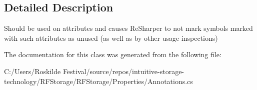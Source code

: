 \subsection{Detailed Description}
Should be used on attributes and causes Re\+Sharper to not mark symbols marked with such attributes as unused (as well as by other usage inspections) 



The documentation for this class was generated from the following file\+:\begin{DoxyCompactItemize}
\item 
C\+:/\+Users/\+Roskilde Festival/source/repos/intuitive-\/storage-\/technology/\+R\+F\+Storage/\+R\+F\+Storage/\+Properties/Annotations.\+cs\end{DoxyCompactItemize}
